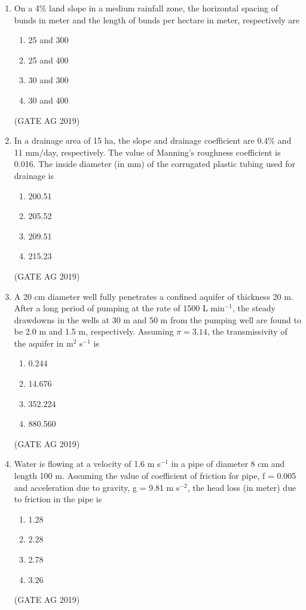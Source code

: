 \documentclass[journal,12pt,onecolumn]{IEEEtran}
\theoremstyle{remark}
\begin{document}
\begin{enumerate}
\item 
On a 4\% land slope in a medium rainfall zone, the horizontal spacing of bunds in meter and the length of bunds per hectare in meter, respectively are  
\begin{multicols}{4}
\begin{enumerate}
\item 25 and 300
\item 25 and 400
\item 30 and 300
\item 30 and 400
\end{enumerate}
\end{multicols}
\hfill{(GATE AG 2019)}

\item 
In a drainage area of 15 ha, the slope and drainage coefficient are 0.4\% and 11 mm/day, respectively. The value of Manning's roughness coefficient is 0.016. The inside diameter (in mm) of the corrugated plastic tubing used for drainage is  
\begin{multicols}{4}
\begin{enumerate}
\item 200.51
\item 205.52
\item 209.51
\item 215.23
\end{enumerate}
\end{multicols}
\hfill{(GATE AG 2019)}

\item 
A 20 cm diameter well fully penetrates a confined aquifer of thickness 20 m. After a long period of pumping at the rate of 1500 L min$^{-1}$, the steady drawdowns in the wells at 30 m and 50 m from the pumping well are found to be 2.0 m and 1.5 m, respectively. Assuming $\pi = 3.14$, the transmissivity of the aquifer in m$^2$ s$^{-1}$ is  
\begin{multicols}{4}
\begin{enumerate}
\item 0.244
\item 14.676
\item 352.224
\item 880.560
\end{enumerate}
\end{multicols}
\hfill{(GATE AG 2019)}

\item 
Water is flowing at a velocity of 1.6 m s$^{-1}$ in a pipe of diameter 8 cm and length 100 m. Assuming the value of coefficient of friction for pipe, f = 0.005 and acceleration due to gravity, g = 9.81 m s$^{-2}$, the head loss (in meter) due to friction in the pipe is  
\begin{multicols}{4}
\begin{enumerate}
\item 1.28
\item 2.28
\item 2.78
\item 3.26
\end{enumerate}
\end{multicols}
\hfill{(GATE AG 2019)}


\end{enumerate}
\end{document}
